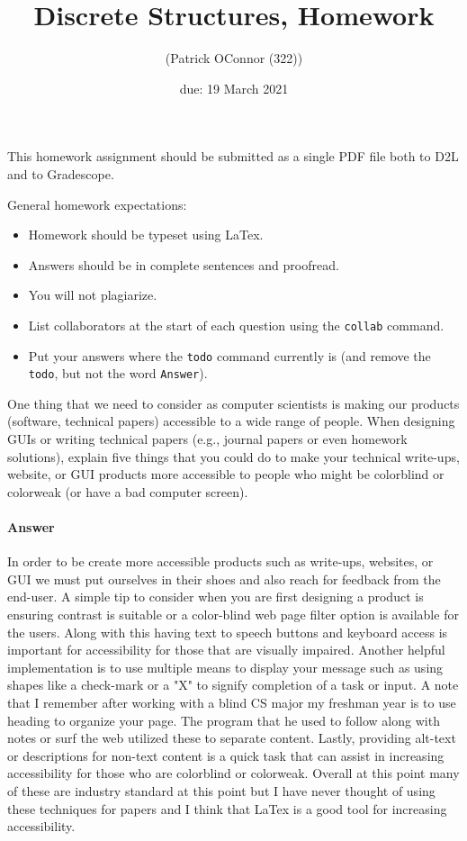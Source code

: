 \documentclass{article}
\title{Discrete Structures, Homework \hwnum}
\author{\todo{Patrick O'Connor} (Patrick OConnor (322))}
\date{due: 19 March 2021}
\begin{document}
\maketitle

This homework assignment should be
submitted as a single PDF file both to D2L and to Gradescope.

General homework expectations:
\begin{itemize}
    \item Homework should be typeset using LaTex.
    \item Answers should be in complete sentences and proofread.
    \item You will not plagiarize.
    \item List collaborators at the start of each question using the \texttt{collab} command.
    \item Put your answers where the \texttt{todo} command currently is (and
        remove the \texttt{todo}, but not the word \texttt{Answer}).
\end{itemize}


 

One thing that we need to consider as computer scientists is making our products
(software, technical papers) accessible to a wide range of people. When
designing GUIs or writing technical papers (e.g., journal papers or even
homework solutions), explain five things that you could do to make your
technical write-ups, website, or GUI products more accessible to people who
might be colorblind or colorweak (or have a bad computer screen).


\paragraph{Answer}

In order to be create more accessible products such as write-ups, websites, or GUI
we must put ourselves in their shoes and also reach for feedback from the end-user.
A simple tip to consider when you are first designing a product is ensuring
contrast is suitable or a color-blind web page filter option is available for
the users. Along with this having text to speech buttons and keyboard access is
important for accessibility for those that are visually impaired. Another helpful
implementation is to use multiple means to display your message such as using
shapes like a check-mark or a "X" to signify completion of a task or input. A
note that I remember after working with a blind CS major my freshman year is to
use heading to organize your page. The program that he used to follow along with
notes or surf the web utilized these to separate content. Lastly, providing alt-text
or descriptions for non-text content is a quick task that can assist in increasing
accessibility for those who are colorblind or colorweak. Overall at this point
many of these are industry standard at this point but I have never thought of using
these techniques for papers and I think that LaTex is a good tool for increasing
accessibility.
\end{document}
